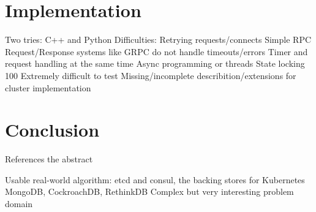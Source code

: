 \section{Implementation}
Two tries: C++ and Python
Difficulties:
Retrying requests/connects
Simple RPC Request/Response systems like GRPC do not handle timeouts/errors 
Timer and request handling at the same time
Async programming or threads
State locking
100%
Extremely difficult to test
Missing/incomplete describition/extensions for cluster implementation

\section{Conclusion}
References the abstract

Usable real-world algorithm:
etcd and consul, the backing stores for Kubernetes
MongoDB, CockroachDB, RethinkDB
Complex but very interesting problem domain



 


